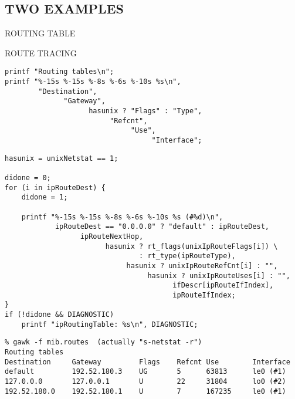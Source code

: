 \begin{bwslide}
\part*	{TWO EXAMPLES}\bf

\begin{nrtc}
\item	ROUTING TABLE

\item	ROUTE TRACING
\end{nrtc}
\end{bwslide}


\begin{bwslide}

\vspace{0.5in}
\smaller
\begin{verbatim}
printf "Routing tables\n";
printf "%-15s %-15s %-8s %-6s %-10s %s\n",
        "Destination",
              "Gateway",
                    hasunix ? "Flags" : "Type",
                         "Refcnt",
                              "Use",
                                   "Interface";
\end{verbatim}
\end{bwslide}


\begin{bwslide}

\vspace{0.5in}
\smaller
\begin{verbatim}
hasunix = unixNetstat == 1;

didone = 0;
for (i in ipRouteDest) {
    didone = 1;

    printf "%-15s %-15s %-8s %-6s %-10s %s (#%d)\n",
            ipRouteDest == "0.0.0.0" ? "default" : ipRouteDest,
                  ipRouteNextHop,
                        hasunix ? rt_flags(unixIpRouteFlags[i]) \
                                : rt_type(ipRouteType),
                             hasunix ? unixIpRouteRefCnt[i] : "",
                                  hasunix ? unixIpRouteUses[i] : "",
                                        ifDescr[ipRouteIfIndex],
                                        ipRouteIfIndex;
}
if (!didone && DIAGNOSTIC)
    printf "ipRoutingTable: %s\n", DIAGNOSTIC;
\end{verbatim}
\end{bwslide}


\begin{bwslide}

\vspace{0.5in}
\smaller
\begin{verbatim}
% gawk -f mib.routes  (actually "s-netstat -r")
Routing tables
Destination     Gateway         Flags    Refcnt Use        Interface
default         192.52.180.3    UG       5      63813      le0 (#1)
127.0.0.0       127.0.0.1       U        22     31804      lo0 (#2)
192.52.180.0    192.52.180.1    U        7      167235     le0 (#1)
\end{verbatim}
\end{bwslide}


